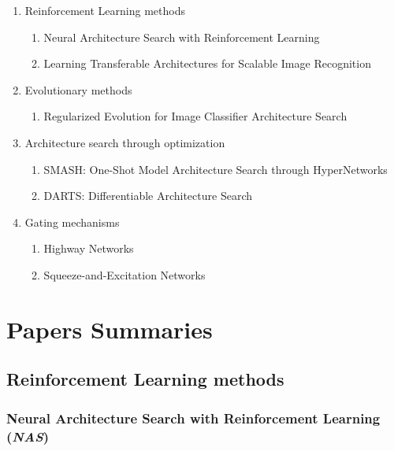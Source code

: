 \documentclass[11pt,a4paper]{article}
\begin{document}
\begin{enumerate}
   \item Reinforcement Learning methods
     \begin{enumerate}
       \item  Neural Architecture Search with Reinforcement Learning \citep{Zoph2017}
       \item  Learning Transferable Architectures for Scalable Image Recognition \citep{Zoph2018}
     \end{enumerate}   
   
   \item Evolutionary methods
     \begin{enumerate}
       \item  Regularized Evolution for Image Classifier Architecture Search \citep{Real2018}
     \end{enumerate}
     
     \item Architecture search through optimization
     \begin{enumerate}
       \item   SMASH: One-Shot Model Architecture Search through HyperNetworks \citep{brock2017smash}
       \item  DARTS: Differentiable Architecture Search \citep{Liu2018}
     \end{enumerate}
     
      \item Gating mechanisms
     \begin{enumerate}
       \item   Highway Networks \citep{srivastava2015highway}
       \item   Squeeze-and-Excitation Networks \citep{hu2019squeezeandexcitation}
     \end{enumerate}
     
 \end{enumerate}

\section{Papers Summaries}
\label{summary}

\subsection{Reinforcement Learning methods}

\subsubsection{Neural Architecture Search with Reinforcement Learning (\textit{NAS})}
\label{summary:nas}
\end{document}

